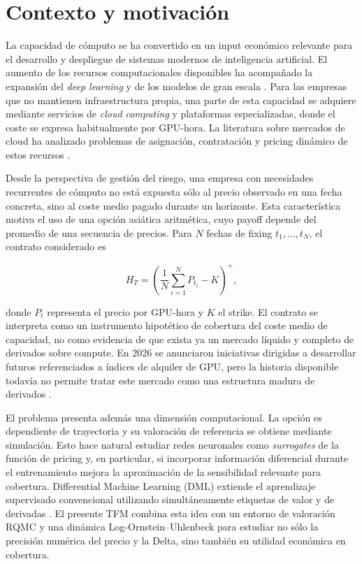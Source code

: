 \section{Contexto y motivación}
\label{sec:contexto_motivacion}

La capacidad de cómputo se ha convertido en un input económico relevante para el
desarrollo y despliegue de sistemas modernos de inteligencia artificial. El aumento
de los recursos computacionales disponibles ha acompañado la expansión del
\textit{deep learning} y de los modelos de gran escala
\parencite{sevilla2022compute}. Para las empresas que no mantienen infraestructura
propia, una parte de esta capacidad se adquiere mediante servicios de
\textit{cloud computing} y plataformas especializadas, donde el coste se expresa
habitualmente por GPU-hora. La literatura sobre mercados de cloud ha analizado
problemas de asignación, contratación y pricing dinámico de estos recursos
\parencite{xu2013dynamiccloud,li2016spotpricing,wu2019cloudpricing}.

Desde la perspectiva de gestión del riesgo, una empresa con necesidades recurrentes
de cómputo no está expuesta sólo al precio observado en una fecha concreta, sino al
coste medio pagado durante un horizonte. Esta característica motiva el uso de una
opción asiática aritmética, cuyo payoff depende del promedio de una secuencia de
precios. Para $N$ fechas de fixing $t_1,\ldots,t_N$, el contrato considerado es

\begin{equation}
    H_T
    =
    \left(
        \frac{1}{N}\sum_{i=1}^{N} P_{t_i}-K
    \right)^+,
\end{equation}

donde $P_t$ representa el precio por GPU-hora y $K$ el strike. El contrato se
interpreta como un instrumento hipotético de cobertura del coste medio de capacidad,
no como evidencia de que exista ya un mercado líquido y completo de derivados sobre
compute. En 2026 se anunciaron iniciativas dirigidas a desarrollar futuros
referenciados a índices de alquiler de GPU, pero la historia disponible todavía no
permite tratar este mercado como una estructura madura de derivados
\parencite{cme_compute_2026}.

El problema presenta además una dimensión computacional. La opción es dependiente
de trayectoria y su valoración de referencia se obtiene mediante simulación. Esto
hace natural estudiar redes neuronales como \textit{surrogates} de la función de
pricing y, en particular, si incorporar información diferencial durante el
entrenamiento mejora la aproximación de la sensibilidad relevante para cobertura.
Differential Machine Learning (DML) extiende el aprendizaje supervisado convencional
utilizando simultáneamente etiquetas de valor y de derivadas
\parencite{huge_savine_2020}. El presente TFM combina esta idea con un entorno de
valoración RQMC y una dinámica Log-Ornstein--Uhlenbeck para estudiar no sólo la
precisión numérica del precio y la Delta, sino también su utilidad económica en
cobertura.

